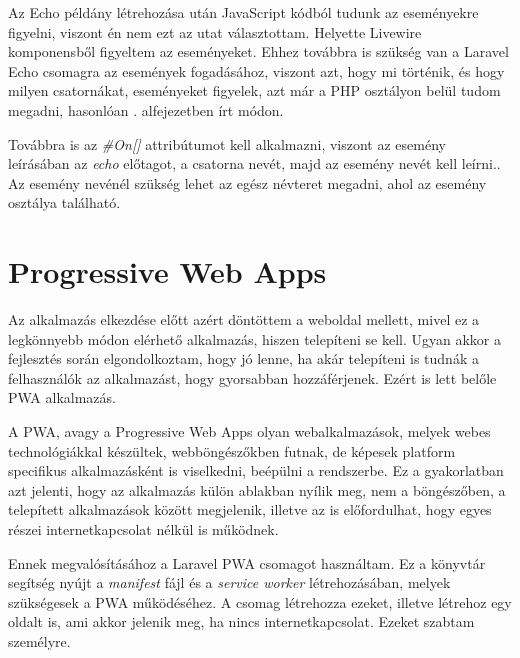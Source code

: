 \documentclass[
]{thesis-ekf}
\theoremstyle{definition}
\theoremstyle{remark}
\begin{document}
Az Echo példány létrehozása után JavaScript kódból tudunk az eseményekre figyelni, viszont én nem ezt az utat választottam. Helyette Livewire komponensből figyeltem az eseményeket. Ehhez továbbra is szükség van a Laravel Echo csomagra az események fogadásához, viszont azt, hogy mi történik, és hogy milyen csatornákat, eseményeket figyelek, azt már a PHP osztályon belül tudom megadni, hasonlóan . alfejezetben írt módon.

Továbbra is az \emph{\#On[]} attribútumot kell alkalmazni, viszont az esemény leírásában az \emph{echo} előtagot, a csatorna nevét, majd az esemény nevét kell leírni.\cite{livewireEcho}. Az esemény nevénél szükség lehet az egész névteret megadni, ahol az esemény osztálya található.



\section{Progressive Web Apps}

Az alkalmazás elkezdése előtt azért döntöttem a weboldal mellett, mivel ez a legkönnyebb módon elérhető alkalmazás, hiszen telepíteni se kell. Ugyan akkor a fejlesztés során elgondolkoztam, hogy jó lenne, ha akár telepíteni is tudnák a felhasználók az alkalmazást, hogy gyorsabban hozzáférjenek. Ezért is lett belőle PWA alkalmazás.

A PWA, avagy a Progressive Web Apps olyan webalkalmazások, melyek webes technológiákkal készültek, webböngészőkben futnak, de képesek platform specifikus alkalmazásként is viselkedni, beépülni a rendszerbe.\cite{PWA} Ez a gyakorlatban azt jelenti, hogy az alkalmazás külön ablakban nyílik meg, nem a böngészőben, a telepített alkalmazások között megjelenik, illetve az is előfordulhat, hogy egyes részei internetkapcsolat nélkül is működnek.

Ennek megvalósításához a Laravel PWA\cite{laravelpwa} csomagot használtam. Ez a könyvtár segítség nyújt a \emph{manifest} fájl és a \emph{service worker} létrehozásában, melyek szükségesek a PWA működéséhez. A csomag létrehozza ezeket, illetve létrehoz egy oldalt is, ami akkor jelenik meg, ha nincs internetkapcsolat. Ezeket szabtam személyre.
\end{document}
